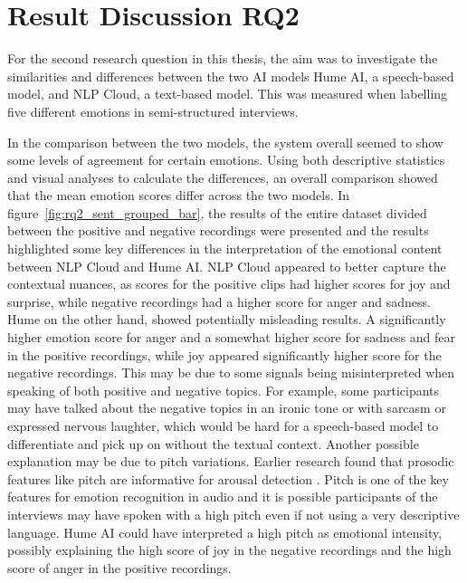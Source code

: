 
\section{Result Discussion RQ2}
For the second research question in this thesis, the aim was to investigate the similarities and differences between the two AI models Hume AI, a speech-based model, and NLP Cloud, a text-based model. This was measured when labelling five different emotions in semi-structured interviews.

\label{subsec:RQ2interpretation}
In the comparison between the two models, the system overall seemed to show some levels of agreement for certain emotions. Using both descriptive statistics and visual analyses to calculate the differences, an overall comparison showed that the mean emotion scores differ across the two models.
In figure~\ref{fig:rq2_sent_grouped_bar}, the results of the entire dataset divided between the positive and negative recordings were presented and the results highlighted some key differences in the interpretation of the emotional content between NLP Cloud and Hume AI. NLP Cloud appeared to better capture the contextual nuances, as scores for the positive clips had higher scores for joy and surprise, while negative recordings had a higher score for anger and sadness. 
Hume on the other hand, showed potentially misleading results. A significantly higher emotion score for anger and a somewhat higher score for sadness and fear in the positive recordings, while joy appeared significantly higher score for the negative recordings. This may be due to some signals being misinterpreted when speaking of both positive and negative topics. For example, some participants may have talked about the negative topics in an ironic tone or with sarcasm or expressed nervous laughter, which would be hard for a speech-based model to differentiate and pick up on without the textual context.
Another possible explanation may be due to pitch variations. Earlier research found that prosodic features like pitch are informative for arousal detection \autocite{Soleymani2017}. Pitch is one of the key features for emotion recognition in audio and it is possible participants of the interviews may have spoken with a high pitch even if not using a very descriptive language. Hume AI could have interpreted a high pitch as emotional intensity, possibly explaining the high score of joy in the negative recordings and the high score of anger in the positive recordings.

